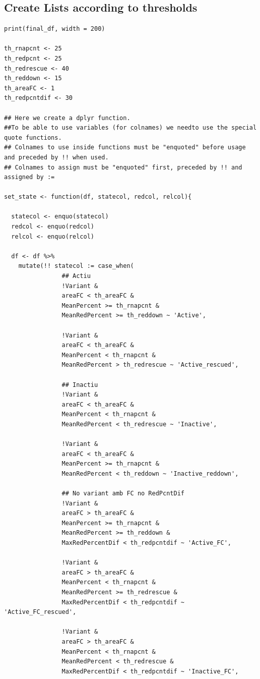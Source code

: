 \documentclass[11pt]{article}
\begin{document}
\subsection{Create Lists according to thresholds}
\label{sec:org3367683}
\begin{verbatim}
print(final_df, width = 200)

th_rnapcnt <- 25
th_redpcnt <- 25
th_redrescue <- 40
th_reddown <- 15
th_areaFC <- 1
th_redpcntdif <- 30

## Here we create a dplyr function.
##To be able to use variables (for colnames) we needto use the special quote functions.
## Colnames to use inside functions must be "enquoted" before usage and preceded by !! when used.
## Colnames to assign must be "enquoted" first, preceded by !! and assigned by :=

set_state <- function(df, statecol, redcol, relcol){

  statecol <- enquo(statecol)
  redcol <- enquo(redcol)
  relcol <- enquo(relcol)

  df <- df %>%
    mutate(!! statecol := case_when(
                ## Actiu
                !Variant &
                areaFC < th_areaFC &
                MeanPercent >= th_rnapcnt &
                MeanRedPercent >= th_reddown ~ 'Active',

                !Variant &
                areaFC < th_areaFC &
                MeanPercent < th_rnapcnt &
                MeanRedPercent > th_redrescue ~ 'Active_rescued',

                ## Inactiu
                !Variant &
                areaFC < th_areaFC &
                MeanPercent < th_rnapcnt &
                MeanRedPercent < th_redrescue ~ 'Inactive',

                !Variant &
                areaFC < th_areaFC &
                MeanPercent >= th_rnapcnt &
                MeanRedPercent < th_reddown ~ 'Inactive_reddown',

                ## No variant amb FC no RedPcntDif
                !Variant &
                areaFC > th_areaFC &
                MeanPercent >= th_rnapcnt &
                MeanRedPercent >= th_reddown &
                MaxRedPercentDif < th_redpcntdif ~ 'Active_FC',

                !Variant &
                areaFC > th_areaFC &
                MeanPercent < th_rnapcnt &
                MeanRedPercent >= th_redrescue &
                MaxRedPercentDif < th_redpcntdif ~ 'Active_FC_rescued',

                !Variant &
                areaFC > th_areaFC &
                MeanPercent < th_rnapcnt &
                MeanRedPercent < th_redrescue &
                MaxRedPercentDif < th_redpcntdif ~ 'Inactive_FC',


\end{verbatim}
\end{document}
